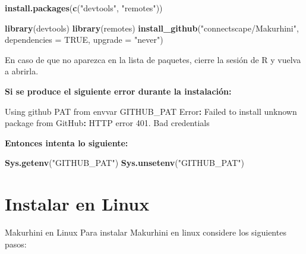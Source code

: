 \documentclass[
]{book}
\newenvironment{Shaded}{\begin{snugshade}}{\end{snugshade}}
\newcommand{\AttributeTok}[1]{\textcolor[rgb]{0.13,0.29,0.53}{#1}}
\newcommand{\ConstantTok}[1]{\textcolor[rgb]{0.56,0.35,0.01}{#1}}
\newcommand{\FloatTok}[1]{\textcolor[rgb]{0.00,0.00,0.81}{#1}}
\newcommand{\FunctionTok}[1]{\textcolor[rgb]{0.13,0.29,0.53}{\textbf{#1}}}
\newcommand{\NormalTok}[1]{#1}
\newcommand{\SpecialCharTok}[1]{\textcolor[rgb]{0.81,0.36,0.00}{\textbf{#1}}}
\newcommand{\StringTok}[1]{\textcolor[rgb]{0.31,0.60,0.02}{#1}}
\begin{document}
\begin{Shaded}
\begin{Highlighting}[]
\FunctionTok{install.packages}\NormalTok{(}\FunctionTok{c}\NormalTok{(}\StringTok{"devtools"}\NormalTok{, }\StringTok{"remotes"}\NormalTok{))}
\end{Highlighting}
\end{Shaded}

\begin{Shaded}
\begin{Highlighting}[]
\FunctionTok{library}\NormalTok{(devtools) }
\FunctionTok{library}\NormalTok{(remotes)}
\FunctionTok{install\_github}\NormalTok{(}\StringTok{"connectscape/Makurhini"}\NormalTok{, }\AttributeTok{dependencies =} \ConstantTok{TRUE}\NormalTok{, }\AttributeTok{upgrade =} \StringTok{"never"}\NormalTok{)}
\end{Highlighting}
\end{Shaded}

En caso de que no aparezca en la lista de paquetes, cierre la sesión de
R y vuelva a abrirla.

\textbf{Si se produce el siguiente error durante la instalación:}

\begin{Shaded}
\begin{Highlighting}[]
\NormalTok{Using github PAT}
\NormalTok{from envvar GITHUB\_PAT Error}\SpecialCharTok{:}\NormalTok{ Failed to install }\StringTok{\textquotesingle{}unknown package\textquotesingle{}}\NormalTok{ from}
\NormalTok{GitHub}\SpecialCharTok{:}\NormalTok{ HTTP error }\FloatTok{401.}\NormalTok{ Bad credentials}
\end{Highlighting}
\end{Shaded}

\textbf{Entonces intenta lo siguiente:}

\begin{Shaded}
\begin{Highlighting}[]
\FunctionTok{Sys.getenv}\NormalTok{(}\StringTok{"GITHUB\_PAT"}\NormalTok{) }
\FunctionTok{Sys.unsetenv}\NormalTok{(}\StringTok{"GITHUB\_PAT"}\NormalTok{)}
\end{Highlighting}
\end{Shaded}

\section{Instalar en Linux}\label{instalar-en-linux}

Makurhini en Linux Para instalar Makurhini en linux considere los
siguientes pasos:
\end{document}
